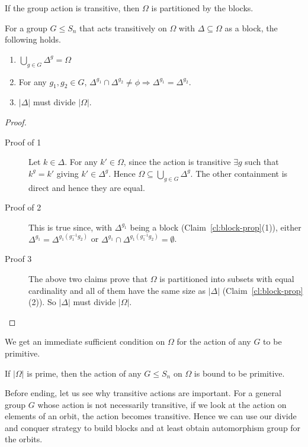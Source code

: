 If the group action is transitive, then $\Omega$ is partitioned by the
blocks.
\begin{claim} For a group $G \le S_n$ that acts transitively on $\Omega$ with
	$\Delta \subseteq \Omega$ as a block, the following holds.
	\begin{enumerate}
		\item $\bigcup_{g \in G} \Delta^g = \Omega$
		\item For any $g_1, g_2 \in G$,  $\Delta^{g_1} \cap
			\Delta^{g_2} \ne \phi \Rightarrow \Delta^{g_1} =
			\Delta^{g_2}$.  
		\item $|\Delta|$ must divide $|\Omega|$.
	\end{enumerate}
\end{claim}
\begin{proof}
	\begin{description}
		\item[Proof of 1] 
Let $k \in \Delta$. For any $k' \in \Omega$, since the action is transitive
$\exists g$ such that  $k^g = k'$ giving $k' \in \Delta^g$. Hence $\Omega
\subseteq \bigcup_{g \in G} \Delta^g $. The other containment is direct and
hence they are equal.
		\item[Proof of 2]
		This is true since, with $\Delta^{g_1}$ being a block
		(Claim~\ref{cl:block-prop}(1)), either $\Delta^{g_1} =
		\Delta^{g_1(g_1^{-1}g_2)}$ or  $\Delta^{g_1} \cap
		\Delta^{g_1(g_1^{-1}g_2)} = \emptyset$.
	\item[Proof 3] The above two claims prove that $\Omega$ is partitioned
		into subsets with equal cardinality and all of them have the
		same size as $|\Delta|$ (Claim~\ref{cl:block-prop}(2)). So
		$|\Delta|$ must divide $|\Omega|$.  \end{description}
\end{proof}

We get an immediate sufficient condition on $\Omega$ for the action of any 
$G$ to be primitive. 
\begin{corollary}
	If $|\Omega |$ is prime, then the action of any $G \le S_n$ on
	$\Omega$ is bound to be primitive.  
\end{corollary}

Before ending, let us see why transitive actions are important. For a general
group $G$ whose action is not necessarily transitive, if we look at the
action on elements of an orbit, the action becomes transitive. Hence we can
use our divide and conquer strategy to build blocks and at least obtain
automorphism group for the orbits.

